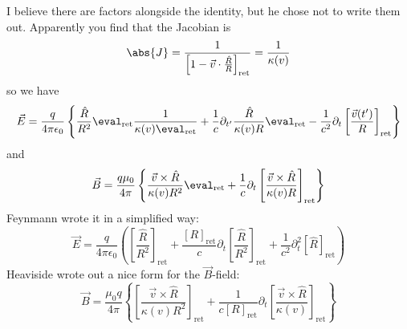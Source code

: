 \documentclass[a4paper,twoside,master.tex]{subfiles}
\begin{document}
I believe there are factors alongside the identity, but he chose not to write them out. Apparently you find that the Jacobian is
\begin{equation}
    \abs{J} = \frac{1}{\left[ 1 - \vec{v} \cdot \frac{ \hat{R}}{R} \right]_{\text{ret}}} = \frac{1}{ \kappa(v)}
\end{equation}
so we have
\begin{equation}
    \vec{E} = \frac{q}{4 \pi \epsilon_0} \left\{ \frac{ \hat{R}}{R^2}\eval_{\text{ret}} \frac{1}{\kappa(v)\eval_{\text{ret}}} + \frac{1}{c} \partial_{t'} \frac{ \hat{R}}{\kappa(v) R}\eval_{\text{ret}} - \frac{1}{c^2} \partial_t \left[ \frac{ \vec{v}(t')}{R} \right]_{\text{ret}} \right\}
\end{equation}
and
\begin{equation}
    \vec{B} = \frac{q \mu_0}{4 \pi} \left\{ \frac{ \vec{v} \times \hat{R}}{\kappa(v) R^2}\eval_{\text{ret}} + \frac{1}{c} \partial_t \left[ \frac{ \vec{v} \times \hat{R}}{\kappa(v) R} \right]_{\text{ret}} \right\}
\end{equation}
Feynmann wrote it in a simplified way:
\begin{equation}
    \vec{E} = \frac{q}{4 \pi \epsilon_0} \left( \left[ \frac{ \hat{R}}{R^2} \right]_{\text{ret}} + \frac{\left[ R \right]_{\text{ret}}}{c} \partial_t \left[ \frac{ \hat{R}}{R^2} \right]_{\text{ret}} + \frac{1}{c^2} \partial^2_t [ \hat{R}]_{\text{ret}} \right)
\end{equation}
Heaviside wrote out a nice form for the $ \vec{B} $-field:
\begin{equation}
    \vec{B} = \frac{\mu_0 q}{4 \pi} \left\{ \left[ \frac{ \vec{v} \times \hat{R}}{\kappa(v) R^2} \right]_{\text{ret}} + \frac{1}{c [R]_{\text{ret}}} \partial_t \left[ \frac{ \vec{v} \times \hat{R}}{\kappa(v)} \right]_{\text{ret}} \right\}
\end{equation}
\end{document}
